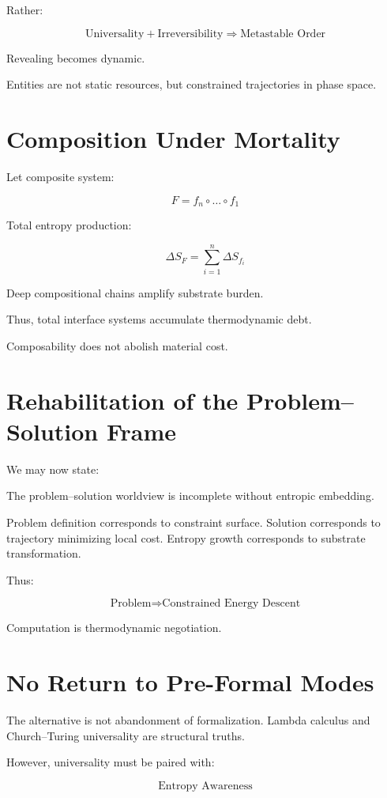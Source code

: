 \documentclass[11pt,openany]{book}
\begin{document}
Rather:

\[
\text{Universality} + \text{Irreversibility}
\Rightarrow \text{Metastable Order}
\]

Revealing becomes dynamic.

Entities are not static resources,
but constrained trajectories in phase space.

\section{Composition Under Mortality}

Let composite system:

\[
F = f_n \circ \dots \circ f_1
\]

Total entropy production:

\[
\Delta S_F = \sum_{i=1}^n \Delta S_{f_i}
\]

Deep compositional chains amplify substrate burden.

Thus, total interface systems accumulate thermodynamic debt.

Composability does not abolish material cost.

\section{Rehabilitation of the Problem--Solution Frame}

We may now state:

The problem--solution worldview is incomplete without entropic embedding.

Problem definition corresponds to constraint surface.
Solution corresponds to trajectory minimizing local cost.
Entropy growth corresponds to substrate transformation.

Thus:

\[
\text{Problem} \Rightarrow \text{Constrained Energy Descent}
\]

Computation is thermodynamic negotiation.

\section{No Return to Pre-Formal Modes}

The alternative is not abandonment of formalization.
Lambda calculus and Church--Turing universality are structural truths.

However, universality must be paired with:

\[
\text{Entropy Awareness}
\]
\end{document}
